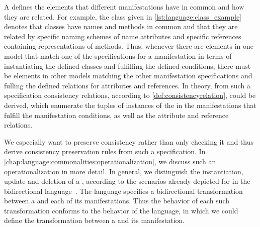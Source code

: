 A \commonality defines the elements that different manifestations have in common and how they are related.
For example, the class \commonality given in \autoref{lst:language:class_example} denotes that classes have names and methods in common and that they are related by specific naming schemes of name attributes and specific references containing representations of methods.
Thus, whenever there are elements in one model that match one of the specifications for a manifestation in terms of instantiating the defined classes and fulfilling the defined conditions, there must be elements in other models matching the other manifestation specifications and fulling the defined relations for attributes and references.
In theory, from such a specification consistency relations, according to \autoref{def:consistencyrelation}, could be derived, which enumerate the tuples of instances of the \metaclasses in the manifestations that fulfill the manifestation conditions, as well as the attribute and reference relations.

We especially want to preserve consistency rather than only checking it and thus derive consistency preservation rules from such a specification.
In \autoref{chap:language:commonalities:operationalization}, we discuss such an operationalization in more detail.
In general, we distinguish the instantiation, update and deletion of a \commonality, according to the scenarios already depicted for \mappings in the bidirectional \mappings language~\cite[Sec. 7.2.1]{klare2020Vitruv-JSS}.
The \commonalities language specifies a bidirectional transformation between a \commonality and each of its manifestations.
Thus the behavior of each such transformation conforms to the behavior of the \mappings language, in which we could define the transformation between a \commonality and its manifestation.

